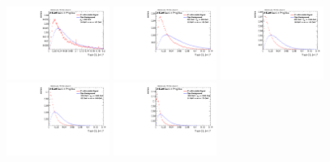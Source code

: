 \begin{figure}[H]
\includegraphics[width=0.3\textwidth]{sascha_input/Appendix/Distributions/higgs/distributions/beta17/h_normal_tj_C2_17_bin1.pdf} \hspace{1mm}
\includegraphics[width=0.3\textwidth]{sascha_input/Appendix/Distributions/higgs/distributions/beta17/h_normal_tj_C2_17_bin2.pdf} \hspace{4mm}
\includegraphics[width=0.3\textwidth]{sascha_input/Appendix/Distributions/higgs/distributions/beta17/h_normal_tj_C2_17_bin3.pdf} 
\bigskip
\includegraphics[width=0.3\textwidth]{sascha_input/Appendix/Distributions/higgs/distributions/beta17/h_normal_tj_C2_17_bin4.pdf} \hspace{4mm}
\includegraphics[width=0.3\textwidth]{sascha_input/Appendix/Distributions/higgs/distributions/beta17/h_normal_tj_C2_17_bin5.pdf} 


\end{figure}
